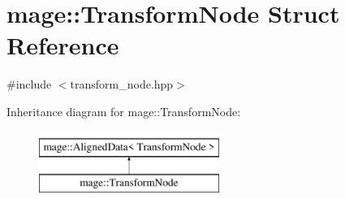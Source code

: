 \hypertarget{structmage_1_1_transform_node}{}\section{mage\+:\+:Transform\+Node Struct Reference}
\label{structmage_1_1_transform_node}


{\ttfamily \#include $<$transform\+\_\+node.\+hpp$>$}

Inheritance diagram for mage\+:\+:Transform\+Node\+:\begin{figure}[H]
\begin{center}
\leavevmode
\includegraphics[height=2.000000cm]{structmage_1_1_transform_node}
\end{center}
\end{figure}
